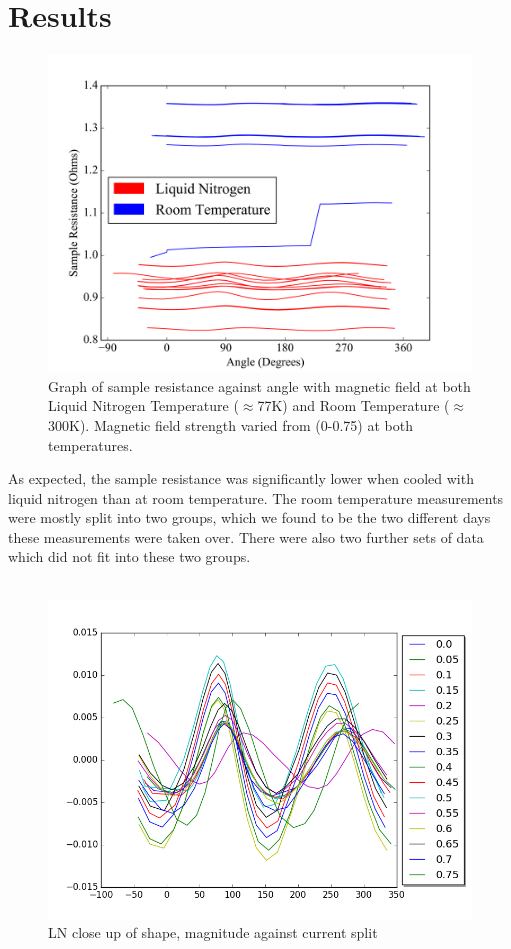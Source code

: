 \documentclass[10pt, twocolumn]{revtex4}
\begin{document}
\section{Results}

\begin{figure}[H]
	\centering
	\includegraphics[width = \columnwidth]{LNRTfig.png}
	\caption{Graph of sample resistance against angle with magnetic field at both Liquid Nitrogen Temperature ($\approx$77K) and Room Temperature ($\approx$300K). Magnetic field strength varied from (0-0.75) at both temperatures.}
	\label{fig:horiz_all}
\end{figure}

As expected, the sample resistance was significantly lower when cooled with liquid nitrogen than at room temperature. The room temperature measurements were mostly split into two groups, which we found to be the two different days these measurements were taken over. There were also two further sets of data which did not fit into these two groups.\\ %
\\
\begin{figure}[H]
	\centering
	\includegraphics[width = \columnwidth]{LN_adj_fig.png}
	\caption{LN close up of shape, magnitude against current split}
	\label{fig:horiz_LN}
\end{figure}
\end{document}
